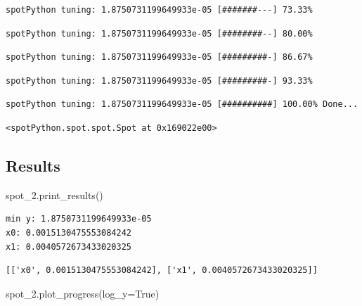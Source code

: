 \documentclass[
  letterpaper,
  DIV=11,
  numbers=noendperiod]{scrreprt}
\newenvironment{Shaded}{\begin{snugshade}}{\end{snugshade}}
\newcommand{\NormalTok}[1]{\textcolor[rgb]{0.00,0.23,0.31}{#1}}
\newcommand{\OperatorTok}[1]{\textcolor[rgb]{0.37,0.37,0.37}{#1}}
\newcommand{\VariableTok}[1]{\textcolor[rgb]{0.07,0.07,0.07}{#1}}
\begin{document}
\begin{verbatim}
spotPython tuning: 1.8750731199649933e-05 [#######---] 73.33% 
\end{verbatim}

\begin{verbatim}
spotPython tuning: 1.8750731199649933e-05 [########--] 80.00% 
\end{verbatim}

\begin{verbatim}
spotPython tuning: 1.8750731199649933e-05 [#########-] 86.67% 
\end{verbatim}

\begin{verbatim}
spotPython tuning: 1.8750731199649933e-05 [#########-] 93.33% 
\end{verbatim}

\begin{verbatim}
spotPython tuning: 1.8750731199649933e-05 [##########] 100.00% Done...
\end{verbatim}

\begin{verbatim}
<spotPython.spot.spot.Spot at 0x169022e00>
\end{verbatim}

\hypertarget{results-1}{%
\subsection{Results}\label{results-1}}

\begin{Shaded}
\begin{Highlighting}[]
\NormalTok{spot\_2.print\_results()}
\end{Highlighting}
\end{Shaded}

\begin{verbatim}
min y: 1.8750731199649933e-05
x0: 0.0015130475553084242
x1: 0.0040572673433020325
\end{verbatim}

\begin{verbatim}
[['x0', 0.0015130475553084242], ['x1', 0.0040572673433020325]]
\end{verbatim}

\begin{Shaded}
\begin{Highlighting}[]
\NormalTok{spot\_2.plot\_progress(log\_y}\OperatorTok{=}\VariableTok{True}\NormalTok{)}
\end{Highlighting}
\end{Shaded}
\end{document}
